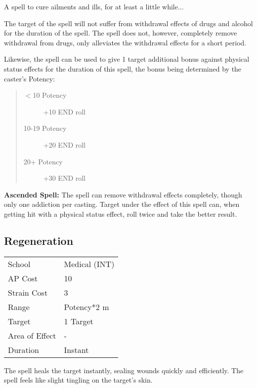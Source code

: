 \documentclass[11pt,a4paper,twocolumn]{book}
\begin{document}
\medskip
A spell to cure ailments and ills, for at least a little while...

The target of the spell will not suffer from withdrawal effects of drugs and alcohol for the duration of the spell. The spell does not, however, completely remove withdrawal from drugs, only alleviates the withdrawal effects for a short period.

Likewise, the spell can be used to give 1 target additional bonus against physical status effects for the duration of this spell, the bonus being determined by the caster's Potency:

\begin{quote}
	\begin{description}
		\item[$<$10 Potency] 	+10 END roll
		\item[10-19 Potency] 	+20 END roll
		\item[20+ Potency] 	    +30 END roll
	\end{description}
\end{quote}

\bigskip

\textbf{Ascended Spell:} The spell can remove withdrawal effects completely, though only one addiction per casting. Target under the effect of this spell can, when getting hit with a physical status effect, roll twice and take the better result.

\vfill

\subsection*{Regeneration}
{
	\begin{tabu} to 75mm{| X[l,4] | X[l,7] |}
		\hline
		School 			& Medical (INT) 		\\
		AP Cost	      	& 10 					\\
		Strain Cost     & 3 					\\
		Range     		& Potency*2	m			\\
		Target      	& 1 Target				\\
		Area of Effect  & -  	 				\\
		Duration     	& Instant				\\ \hline
	\end{tabu}
	
}

\medskip

The spell heals the target instantly, sealing wounds quickly and efficiently. The spell feels like slight tingling on the target's skin.
\end{document}
